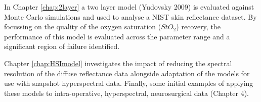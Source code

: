 In Chapter \ref{chap:2layer} a two layer model (Yudovsky 2009) is evaluated against Monte Carlo simulations and used to analyse a NIST skin reflectance dataset. By focussing on the quality of the oxygen saturation ($StO_2$) recovery, the performance of this model is evaluated across the parameter range and a significant region of failure identified. 

Chapter \ref{chap:HSImodel} investigates the impact of reducing the spectral resolution of the diffuse reflectance data alongside adaptation of the models for use with snapshot hyperspectral data. Finally, some initial examples of applying these models to intra-operative, hyperspectral, neurosurgical data (Chapter 4). 